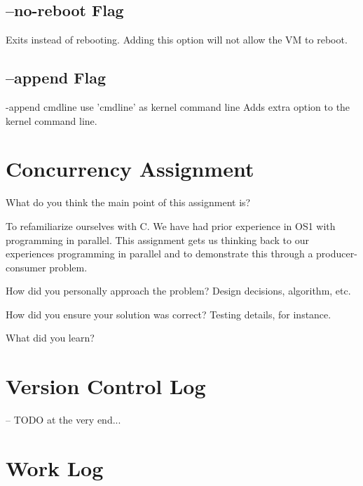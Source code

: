 \documentclass{article}
\newenvironment{question}[2][Question]	{\begin{trivlist}
\item[\hskip \labelsep {\bfseries #1}\hskip \labelsep {\bfseries #2.}]}
{\end{trivlist}} %
\begin{document}
\subsection{--no-reboot Flag}
Exits instead of rebooting. Adding this option will not allow the VM to reboot.

\subsection{--append Flag}
-append cmdline use 'cmdline' as kernel command line
Adds extra option to the kernel command line.


\section{Concurrency Assignment}
\begin{question}{1}
What do you think the main point of this assignment is?
\end{question}

To refamiliarize ourselves with C. We have had prior experience in OS1 with programming in parallel. This assignment gets us thinking back to our experiences programming in parallel and to demonstrate this through a producer-consumer problem.

\begin{question}{2}
How did you personally approach the problem? Design decisions, algorithm, etc.
\end{question}

\begin{question}{3}
How did you ensure your solution was correct? Testing details, for instance.
\end{question}

\begin{question}{4}
What did you learn?
\end{question}

\section{Version Control Log}
-- TODO at the very end...

\section{Work Log}
\end{document}
